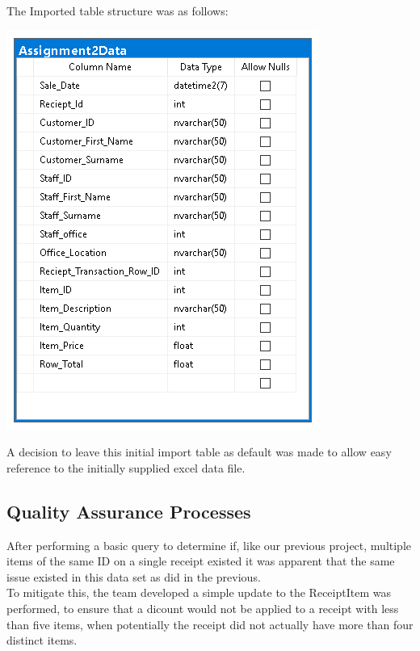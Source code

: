 \documentclass{article}
\begin{document}
		\vspace{2mm}        
        
        The Imported table structure was as follows:

		\vspace{2mm}
		
        \begin{center}
            \includegraphics{Images/Initial_Import.PNG}
        \end{center}
		
		\vspace{5mm}		
        
        \noindent
        A decision to leave this initial import table as default
        was made to allow easy reference to the initially supplied
        excel data file.

\newpage
        

        \subsection{Quality Assurance Processes}
        \label{sec:QAP}
        After performing a basic query to determine if, like our previous project, multiple 
        items of the same ID on a single receipt existed it was 
        apparent that the same issue existed in this data set as did in the previous.
        \\
        To mitigate this, the team developed a simple update to the 
        ReceiptItem was performed, to ensure that a dicount would not be applied to a receipt with 
        less than five items, when potentially the receipt did not 
        actually have more than four distinct items. \\
        
\end{document}
